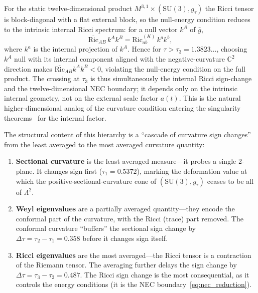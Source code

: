 \documentclass[12pt]{article}
\theoremstyle{definition}
\theoremstyle{remark}
\begin{document}
For the static twelve-dimensional product $M^{3,1}\times(\mathrm{SU}(3),g_\tau)$ the Ricci tensor is block-diagonal with a flat external block, so the null-energy condition reduces to the intrinsic internal Ricci spectrum: for a null vector $k^A$ of $\bar{g}$,
\begin{equation}
\label{eq:nec_reduction}
\overline{\mathrm{Ric}}_{AB}\,k^A k^B = \mathrm{Ric}^{(K)}_{ab}\,k^a k^b ,
\end{equation}
where $k^a$ is the internal projection of $k^A$.  Hence for $\tau>\tau_3=1.3823\ldots$, choosing $k^A$ null with its internal component aligned with the negative-curvature $\mathbb{C}^2$ direction makes $\overline{\mathrm{Ric}}_{AB}k^Ak^B<0$, violating the null-energy condition on the full product.  The crossing at $\tau_3$ is thus simultaneously the internal Ricci sign-change and the twelve-dimensional NEC boundary; it depends only on the intrinsic internal geometry, not on the external scale factor $a(t)$.  This is the natural higher-dimensional analog of the curvature condition entering the singularity theorems~\cite{Penrose1965,HawkingPenrose1970} for the internal factor.

The structural content of this hierarchy is a ``cascade of curvature sign changes'' from the least averaged to the most averaged curvature quantity:

\begin{enumerate}
    \item \textbf{Sectional curvature} is the least averaged measure---it probes a single 2-plane.  It changes sign first ($\tau_1=0.5372$), marking the deformation value at which the positive-sectional-curvature cone of $(\mathrm{SU}(3),g_\tau)$ ceases to be all of $\Lambda^2$.

    \item \textbf{Weyl eigenvalues} are a partially averaged quantity---they encode the conformal part of the curvature, with the Ricci (trace) part removed.  The conformal curvature ``buffers'' the sectional sign change by $\Delta\tau=\tau_2-\tau_1=0.358$ before it changes sign itself.

    \item \textbf{Ricci eigenvalues} are the most averaged---the Ricci tensor is a contraction of the Riemann tensor.  The averaging further delays the sign change by $\Delta\tau=\tau_3-\tau_2=0.487$.  The Ricci sign change is the most consequential, as it controls the energy conditions (it is the NEC boundary~\eqref{eq:nec_reduction}).
\end{enumerate}
\end{document}
